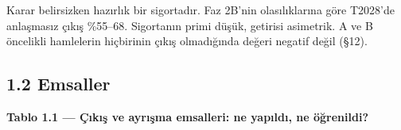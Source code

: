 Karar belirsizken hazırlık bir sigortadır. Faz 2B'nin olasılıklarına göre T2028'de anlaşmasız çıkış \%55--68. Sigortanın primi düşük, getirisi asimetrik. A ve B öncelikli hamlelerin hiçbirinin çıkış olmadığında değeri negatif değil (§12).

\hypertarget{02c_hazirlik-12-emsaller}{%
\subsection{1.2 Emsaller}\label{02c_hazirlik-12-emsaller}}


\textbf{Tablo 1.1 --- Çıkış ve ayrışma emsalleri: ne yapıldı, ne öğrenildi?}

\nopagebreak[4]

\begingroup\gbtablo\small


